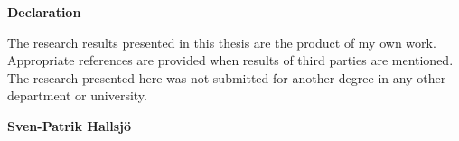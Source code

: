 \vspace*{1.75in}
\begin{center} {\bf Declaration}\end{center}

The research results presented in this thesis are the product of my own work. Appropriate references are provided when results of third parties are mentioned. The research presented here was not submitted for another degree in any other department or university.

\begin{flushright} \textbf{Sven-Patrik Hallsj{\"o}}\end{flushright}
